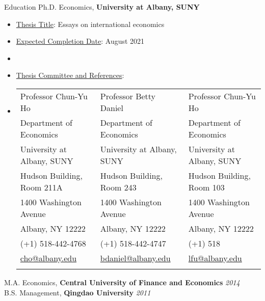 \documentclass{resume_liang} %
\begin{document}
\begin{rSection}{Education}
Ph.D. Economics, {\bf University at Albany, SUNY}                     
  \begin{itemize}
  	\item[] \underline{Thesis Title}: Essays on international economics 
  	\item[] \underline{Expected Completion Date}: August 2021
  	\item[]
  	\item[] \underline{Thesis Committee and References}:
  	\item[] \begin{tabular}{lll}
  		 Professor Chun-Yu Ho  & Professor Betty Daniel  & Professor Chun-Yu Ho\\ 
  		 Department of Economics &  Department of Economics &  Department of Economics\\
  		 University at Albany, SUNY & University at Albany, SUNY & University at Albany, SUNY \\
  		 Hudson Building, Room 211A & Hudson Building, Room 243 & Hudson Building, Room 103 \\
  		 1400 Washington Avenue & 1400 Washington Avenue & 1400 Washington Avenue \\
  		 Albany, NY 12222 & Albany, NY 12222  & Albany, NY 12222 \\
  		 (+1) 518-442-4768 &  (+1) 518-442-4747 &  (+1) 518 \\
  		 \href{mailto:cho@albany.edu}{cho@albany.edu} & \href{mailto:bdaniel@albany.edu}{bdaniel@albany.edu} & \href{mailto:lfu@albany.edu}{lfu@albany.edu} \\
  		 \\
  	\end{tabular}
  \end{itemize}
M.A. Economics, {\bf Central University of Finance and Economics}    \hfill {\em 2014} \\
B.S. Management, {\bf Qingdao University}                            \hfill {\em 2011} \\
\end{rSection}
\bigskip \bigskip






\end{document}
